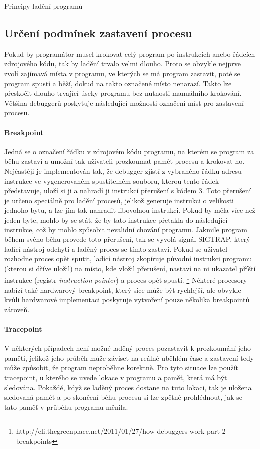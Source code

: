 \documentclass[czech,bachelor,male,python,dept460]{diploma}						%
\begin{document}
\begin{section}{Principy ladění programů}
	\subsection{Určení podmínek zastavení procesu}
		Pokud by programátor musel krokovat celý program po instrukcích anebo řádcích zdrojového kódu, tak by ladění trvalo velmi dlouho.
		Proto se obvykle nejprve zvolí zajímavá místa v programu, ve kterých se má program zastavit, poté se program spustí a běží, dokud na takto označené místo
		nenarazí. Takto lze přeskočit dlouho trvající úseky programu bez nutnosti manuálního krokování. Většina debuggerů poskytuje následující možnosti označení
		míst pro zastavení procesu.
		
		\paragraph*{Breakpoint}
			Jedná se o označení řádku v zdrojovém kódu programu, na kterém se program za běhu zastaví a umožní tak uživateli prozkoumat paměť procesu a krokovat ho.
			Nejčastěji je implementován tak, že debugger zjistí z vybraného řádku adresu instrukce ve vygenerovaném spustitelném souboru, kterou tento
			řádek představuje, uloží si ji a nahradí ji instrukcí přerušení s kódem 3. Toto přerušení je určeno speciálně pro ladění procesů, jelikož generuje
			instrukci o velikosti jednoho bytu, a lze jím tak nahradit libovolnou instrukci. \cite[306]{intel} Pokud by měla více než jeden byte, mohlo by se
			stát, že by tato instrukce přetakla do následující instrukce, což by mohlo způsobit nevalidní chování programu. Jakmile program během svého běhu
			provede toto přerušení, tak se vyvolá signál SIGTRAP, který ladící nástroj odchytí a laděný proces se tímto zastaví. Pokud se uživatel rozhodne proces
			opět sputit, ladící nástroj zkopíruje původní instrukci programu (kterou si dříve uložil) na místo, kde vložil přerušení, nastaví na ni ukazatel
			příští instrukce (registr \textit{instruction pointer}) a proces opět spustí.
			\footnote{http://eli.thegreenplace.net/2011/01/27/how-debuggers-work-part-2-breakpoints}
			Některé procesory nabízí také hardwarový breakpoint, který sice může být rychlejší, ale obvykle kvůli hardwarové implementaci poskytuje
			vytvoření pouze několika breakpointů zároveň.
		\paragraph*{Tracepoint}
			V některých případech není možné laděný proces pozastavit k prozkoumání jeho paměti, jelikož jeho průběh může záviset na reálně uběhlém čase a zastavení
			tedy může způsobit, že program neproběhne korektně. Pro tyto situace lze použít tracepoint, u kterého se uvede lokace v programu a paměť, která má být
			sledována. Pokaždé, když se laděný proces dostane na tuto lokaci, tak je uložena sledovaná paměť a po skončení běhu procesu si lze zpětně prohlédnout,
			jak se tato paměť v průběhu programu měnila.

\end{section}
\end{document}

